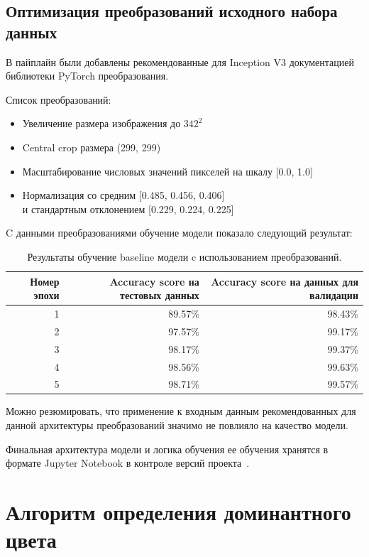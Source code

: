 \documentclass[a4paper,12pt]{extarticle}
\begin{document}
\subsection{Оптимизация преобразований исходного набора данных}

В пайплайн были добавлены рекомендованные для Inception V3 документацией библиотеки PyTorch
преобразования.

Список преобразований:

\begin{itemize}
	\item Увеличение размера изображения до $342^2$
	\item Central crop размера (299, 299)
	\item Масштабирование числовых значений пикселей на шкалу [0.0, 1.0]
	\item Нормализация со средним [0.485, 0.456, 0.406]\\
	и стандартным отклонением [0.229, 0.224, 0.225]
\end{itemize}

C данными преобразованиями обучение модели показало следующий результат:

\begin{table}[ht]
	\caption{Результаты обучение baseline модели c использованием преобразований.}
	\label{table:baseline_transformed_by_epoch}
	\footnotesize
	\centering
	\begin{tabular}{ |r|r|r| }
		\hline
		Номер эпохи & Accuracy score на тестовых данных & Accuracy score на данных для валидации \\ [0.5ex]
		\hline\hline
		1 & 89.57\% & 98.43\% \\
		\hline
		2 & 97.57\% & 99.17\% \\
		\hline
		3 & 98.17\% & 99.37\% \\
		\hline
		4 & 98.56\% & 99.63\% \\
		\hline
		5 & 98.71\% & 99.57\% \\
		\hline
	\end{tabular}
\end{table}

Можно резюмировать, что применение к входным данным рекомендованных для данной
архитектуры преобразований значимо не повлияло на качество модели.

Финальная архитектура модели и логика обучения ее обучения хранятся в формате Jupyter Notebook в
контроле версий проекта~\cite{model}.

\newpage
\section{Алгоритм определения доминантного цвета}
\end{document}

